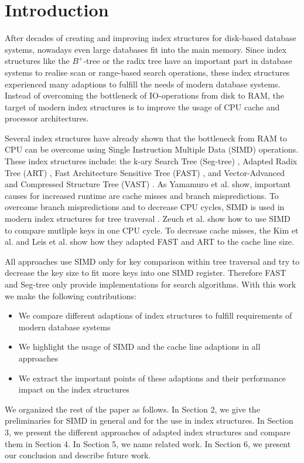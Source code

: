\documentclass[conference]{IEEEtran}
\begin{document}
\section{Introduction}
After decades of creating and improving index structures for disk-based database systems, nowadays even large databases fit into the main memory. Since index structures like the $B^+$-tree or the radix tree have an important part in database systems to realise scan or range-based search operations, these index structures experienced many adaptions to fulfill the needs of modern database systems. Instead of overcoming the bottleneck of IO-operations from disk to RAM, the target of modern index structures is to improve the usage of CPU cache and processor architectures.

Several index structures have already shown that the bottleneck from RAM to CPU can be overcome using Single Instruction Multiple Data (SIMD) \cite{b1} operations. These index structures include: the k-ary Search Tree (Seg-tree) \cite{b3}, Adapted Radix Tree (ART) \cite{b4}, Fast Architecture Sensitive Tree (FAST) \cite{b6}, and Vector-Advanced and Compressed Structure Tree (VAST) \cite{b5}. As Yamamuro et al. show, important causes for increased runtime are cache misses and branch mispredictions. To overcome branch mispredictions and to decrease CPU cycles, SIMD  is used in modern index structures for tree traversal \cite{b2}. Zeuch et al. show how to use SIMD to compare mutliple keys in one CPU cycle. To decrease cache misses, the Kim et al. and Leis et al. show how they adapted FAST and ART to the cache line size.  

All approaches use SIMD only for key comparison within tree traversal and try to decrease the key size to fit more keys into one SIMD register. Therefore FAST and Seg-tree only provide implementations for search algorithms. With this work we make the following contributions:
\begin{itemize}
	\item We compare different adaptions of index structures to fulfill requirements of modern database systems
	\item We highlight the usage of SIMD and the cache line adaptions in all approaches
	\item We extract the important points of these adaptions and their performance impact on the index structures
\end{itemize}
We organized the rest of the paper as follows. In Section 2, we give the preliminaries for SIMD in general and for the use in index structures. In Section 3, we present the different approaches of adapted index structures and compare them in Section 4. In Section 5, we name related work. In Section 6, we present our conclusion and describe future work. 
\end{document}
